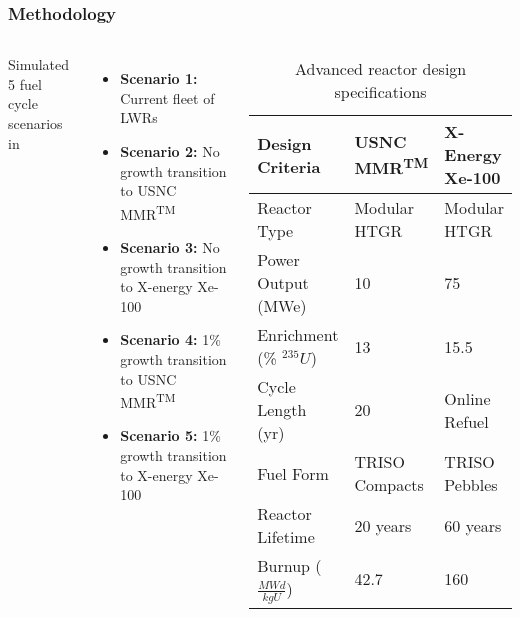 \begin{frame}
    \frametitle{Methodology}
    \begin{columns}
        \column[t]{4.5cm}
        Simulated 5 fuel cycle scenarios in \Cyclus \cite{huff_fundamental_2016}
    \begin{itemize}
        \item \textbf{Scenario 1:} Current fleet of \glspl{LWR}
        \item \textbf{Scenario 2:} No growth transition to \gls{USNC} \gls{MMR}\textsuperscript{TM}
        \item \textbf{Scenario 3:} No growth transition to X-energy Xe-100
        \item \textbf{Scenario 4:} 1\% growth transition to \gls{USNC} \gls{MMR}\textsuperscript{TM}
        \item \textbf{Scenario 5:} 1\% growth transition to X-energy Xe-100
    \end{itemize}

    \column[t]{5.5cm}
    \begingroup
        \renewcommand{\arraystretch}{1.3} %
        \vspace{-0.8cm}
        \begin{table}[t!]
            \small
            \caption{Advanced reactor design specifications}
            \label{tab:reactor_summary}
            \begin{tabular}{ p{1.5cm} p{1.5cm} p{1.25cm}}
                \hline
                Design Criteria & \gls{USNC} \gls{MMR}\textsuperscript{TM} & 
                    X-Energy Xe-100 \\\hline
                Reactor Type & Modular HTGR & Modular HTGR \\
                Power Output (MWe) & 10 & 75 \\
                Enrichment (\% $^{235}U$) & 13 & 15.5 \\
                Cycle Length (yr) & 20 & Online Refuel\\
                Fuel Form & TRISO Compacts & TRISO Pebbles\\
                Reactor Lifetime & 20 years & 60 years \\
                Burnup ($\frac{MWd}{kg U}$) & 42.7 & 160 \\
                \hline
            \end{tabular}
        \end{table}   
        \endgroup
    \end{columns}
\end{frame}

